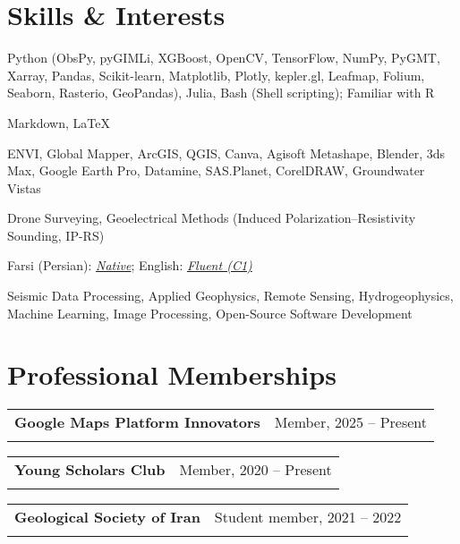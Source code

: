 \documentclass[letterpaper,11pt]{article}
\makeatletter
\newcommand{\ressubheading}[4]{%
	\begin{tabular*}{6.5in}{l@{\cftdotfill{\cftsecdotsep}\extracolsep{\fill}}r}
		\textbf{#1} & #2 \\
		\textit{#3} & \textit{#4} \\
	\end{tabular*}\vspace{-8pt}
}
\makeatother
\begin{document}
	\section{Skills \& Interests}
	\begin{description}[itemsep=0pt]
		
		\item[Programming Languages:] 
		Python (ObsPy, pyGIMLi, XGBoost, OpenCV, TensorFlow, NumPy, PyGMT, Xarray, Pandas, Scikit-learn, Matplotlib, Plotly, kepler.gl, Leafmap, Folium, Seaborn, Rasterio, GeoPandas), Julia, Bash (Shell scripting); Familiar with R
		
		\item[Markup Languages:] 
		Markdown, \LaTeX
		
		\item[Software:] 
		ENVI, Global Mapper, ArcGIS, QGIS, Canva, Agisoft Metashape, Blender, 3ds Max, Google Earth Pro, Datamine, SAS.Planet, CorelDRAW, Groundwater Vistas
		
		\item[Field Techniques:] 
		Drone Surveying, Geoelectrical Methods (Induced Polarization–Resistivity Sounding, IP-RS)
		
		\item[Languages:] 
		Farsi (Persian): \textit{\underline{Native}}; English: \textit{\underline{Fluent (C1)}}
		
		\item[Research Interests:] 
		Seismic Data Processing, Applied Geophysics, Remote Sensing, Hydrogeophysics, Machine Learning, Image Processing, Open-Source Software Development
		
	\end{description}
	\vspace{-2.0em} 
	
	\section{Professional Memberships}
	\vspace{-0.5em} 
	\ressubheading{Google Maps Platform Innovators}{Member, 2025 – Present}{}{}
	\vspace{-0.2em} 
	\vspace{-0.5em} 
	\ressubheading{Young Scholars Club}{Member, 2020 – Present}{}{}
	\vspace{-0.2em} 
	\vspace{-0.5em} 
	\ressubheading{Geological Society of Iran}{Student member, 2021 – 2022}{}{}
	\vspace{2em} 

	
\end{document}
